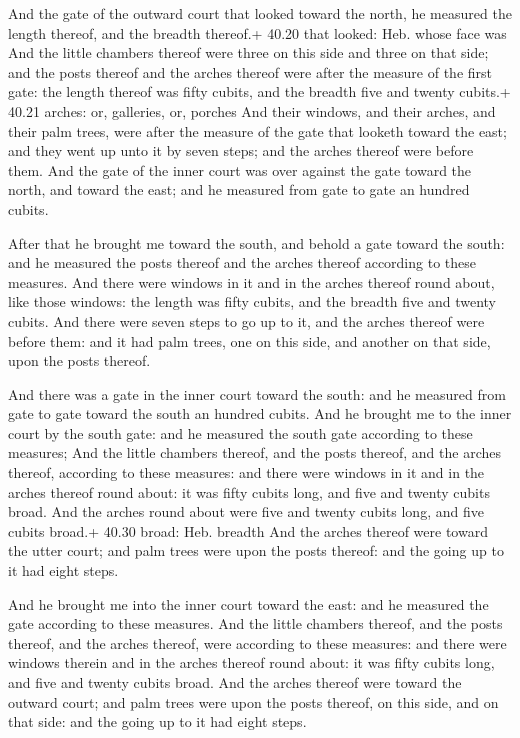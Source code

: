  And the gate of the outward court that looked toward the
north, he measured the length thereof, and the breadth thereof.+ 40.20
that looked: Heb. whose face was  And the little chambers
thereof were three on this side and three on that side; and the posts
thereof and the arches thereof were after the measure of the first gate:
the length thereof was fifty cubits, and the breadth five and twenty
cubits.+ 40.21 arches: or, galleries, or, porches  And
their windows, and their arches, and their palm trees, were after the
measure of the gate that looketh toward the east; and they went up unto
it by seven steps; and the arches thereof were before them.
 And the gate of the inner court was over against the gate
toward the north, and toward the east; and he measured from gate to gate
an hundred cubits.

 After that he brought me toward the south, and behold a
gate toward the south: and he measured the posts thereof and the arches
thereof according to these measures.  And there were
windows in it and in the arches thereof round about, like those windows:
the length was fifty cubits, and the breadth five and twenty cubits.
 And there were seven steps to go up to it, and the arches
thereof were before them: and it had palm trees, one on this side, and
another on that side, upon the posts thereof.

 And there was a gate in the inner court toward the south:
and he measured from gate to gate toward the south an hundred cubits.
 And he brought me to the inner court by the south gate:
and he measured the south gate according to these measures;
 And the little chambers thereof, and the posts thereof,
and the arches thereof, according to these measures: and there were
windows in it and in the arches thereof round about: it was fifty cubits
long, and five and twenty cubits broad.  And the arches
round about were five and twenty cubits long, and five cubits broad.+
40.30 broad: Heb. breadth  And the arches thereof were
toward the utter court; and palm trees were upon the posts thereof: and
the going up to it had eight steps.

 And he brought me into the inner court toward the east:
and he measured the gate according to these measures.  And
the little chambers thereof, and the posts thereof, and the arches
thereof, were according to these measures: and there were windows
therein and in the arches thereof round about: it was fifty cubits long,
and five and twenty cubits broad.  And the arches thereof
were toward the outward court; and palm trees were upon the posts
thereof, on this side, and on that side: and the going up to it had
eight steps.

